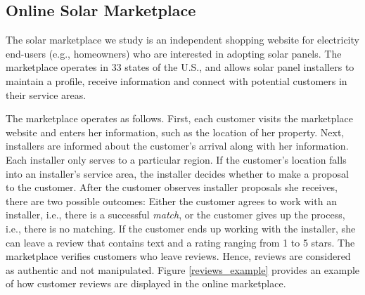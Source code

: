 \documentclass[msom,blindrev]{informs3}
\begin{document}

\subsection{Online Solar Marketplace}

The solar marketplace we study is an independent shopping website for electricity end-users (e.g., homeowners) who are interested in adopting solar panels.  The marketplace operates in 33 states of the U.S., and allows solar panel installers to maintain a profile, receive information and connect with potential customers in their service areas.

The marketplace operates as follows. First, each customer visits the marketplace website and enters her information, such as the location of her property. Next, installers are informed about the customer's arrival along with her information.  Each installer only serves to a particular region. If the customer's location falls into an installer's service area, the installer decides whether to make a proposal to the customer. After the customer observes installer proposals she receives, there are two possible outcomes: Either the customer agrees to work with an installer, i.e., there is a successful \emph{match}, or the customer gives up the process, i.e., there is no matching. If the customer ends up working with the installer, she can leave a review that contains text and a rating ranging from 1 to 5 stars. The marketplace verifies customers who leave reviews. Hence, reviews are considered as authentic and not manipulated. Figure \ref{reviews_example} provides an example of how customer reviews are displayed in the online marketplace.
\end{document}
